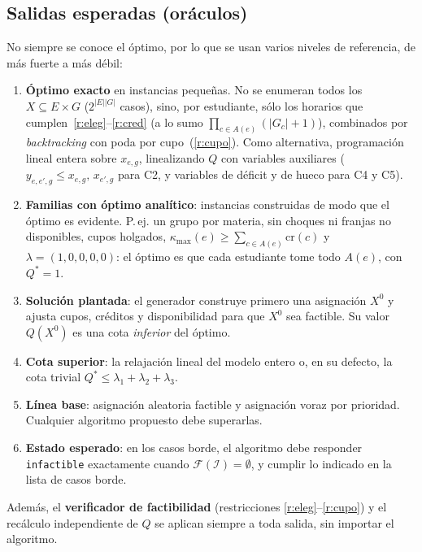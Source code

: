 \documentclass[11pt,letterpaper]{article}
\theoremstyle{definition}
\theoremstyle{remark}
\theoremstyle{plain}
\newcommand{\card}[1]{\lvert #1 \rvert}
\begin{document}
\subsection{Salidas esperadas (oráculos)}
No siempre se conoce el óptimo, por lo que se usan varios niveles de
referencia, de más fuerte a más débil:
\begin{enumerate}[nosep]
  \item \textbf{Óptimo exacto} en instancias pequeñas. No se enumeran todos
        los $X\subseteq E\times G$ ($2^{\card{E}\card{G}}$ casos), sino, por
        estudiante, sólo los horarios que cumplen~\ref{r:eleg}--\ref{r:cred}
        (a lo sumo $\prod_{c\in A(e)}(\card{G_c}+1)$), combinados por
        \emph{backtracking} con poda por cupo~(\ref{r:cupo}). Como
        alternativa, programación lineal entera sobre $x_{e,g}$, linealizando
        $Q$ con variables auxiliares ($y_{e,e',g}\le x_{e,g},\,x_{e',g}$ para
        C2, y variables de déficit y de hueco para C4 y C5).
  \item \textbf{Familias con óptimo analítico}: instancias construidas de
        modo que el óptimo es evidente. P.\,ej. un grupo por materia, sin
        choques ni franjas no disponibles, cupos holgados,
        $\kappa_{\max}(e)\ge\sum_{c\in A(e)}\mathrm{cr}(c)$ y
        $\lambda=(1,0,0,0,0)$: el óptimo es que cada estudiante tome todo
        $A(e)$, con $Q^\ast=1$.
  \item \textbf{Solución plantada}: el generador construye primero una
        asignación $X^0$ y ajusta cupos, créditos y disponibilidad para que
        $X^0$ sea factible. Su valor $Q(X^0)$ es una cota \emph{inferior} del
        óptimo.
  \item \textbf{Cota superior}: la relajación lineal del modelo entero o, en
        su defecto, la cota trivial $Q^\ast\le\lambda_1+\lambda_2+\lambda_3$.
  \item \textbf{Línea base}: asignación aleatoria factible y asignación
        voraz por prioridad. Cualquier algoritmo propuesto debe superarlas.
  \item \textbf{Estado esperado}: en los casos borde, el algoritmo debe
        responder \texttt{infactible} exactamente cuando
        $\mathcal{F}(\mathcal{I})=\emptyset$, y cumplir lo indicado en la
        lista de casos borde.
\end{enumerate}
Además, el \textbf{verificador de factibilidad} (restricciones
\ref{r:eleg}--\ref{r:cupo}) y el recálculo independiente de $Q$ se aplican
siempre a toda salida, sin importar el algoritmo.
\end{document}
